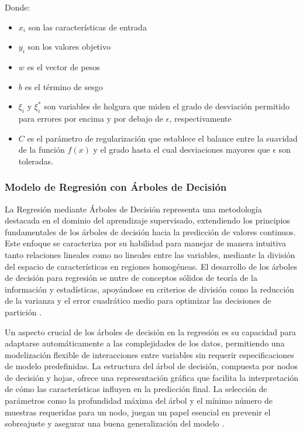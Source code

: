 \documentclass[
  11pt,
  bookmarksnumbered]{article}
\begin{document}
Donde:

\begin{itemize}
\item
  \(x_i\) son las características de entrada
\item
  \(y_i\) son los valores objetivo
\item
  \(w\) es el vector de pesos
\item
  \(b\) es el término de sesgo
\item
  \(\xi_i\) y \(\xi_i^*\) son variables de holgura que miden el grado de desviación permitido para errores por encima y por debajo de \(\epsilon\), respectivamente
\item
  \(C\) es el parámetro de regularización que establece el balance entre la suavidad de la función \(f(x)\) y el grado hasta el cual desviaciones mayores que \(\epsilon\) son toleradas.
\end{itemize}

\hypertarget{modelo-de-regresiuxf3n-con-uxe1rboles-de-decisiuxf3n}{%
\subsubsection{Modelo de Regresión con Árboles de Decisión}\label{modelo-de-regresiuxf3n-con-uxe1rboles-de-decisiuxf3n}}

La Regresión mediante Árboles de Decisión representa una metodología destacada en el dominio del aprendizaje supervisado, extendiendo los principios fundamentales de los árboles de decisión hacia la predicción de valores continuos.
Este enfoque se caracteriza por su habilidad para manejar de manera intuitiva tanto relaciones lineales como no lineales entre las variables, mediante la división del espacio de características en regiones homogéneas.
El desarrollo de los árboles de decisión para regresión se nutre de conceptos sólidos de teoría de la información y estadísticas, apoyándose en criterios de división como la reducción de la varianza y el error cuadrático medio para optimizar las decisiones de partición \textcite{Breiman1984}.

Un aspecto crucial de los árboles de decisión en la regresión es su capacidad para adaptarse automáticamente a las complejidades de los datos, permitiendo una modelización flexible de interacciones entre variables sin requerir especificaciones de modelo predefinidas.
La estructura del árbol de decisión, compuesta por nodos de decisión y hojas, ofrece una representación gráfica que facilita la interpretación de cómo las características influyen en la predicción final.
La selección de parámetros como la profundidad máxima del árbol y el mínimo número de muestras requeridas para un nodo, juegan un papel esencial en prevenir el sobreajuste y asegurar una buena generalización del modelo \textcite{Quinlan1993}.
\end{document}
